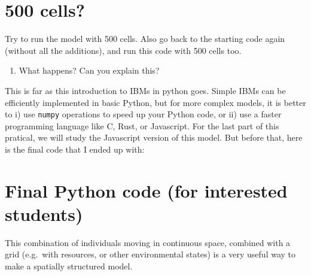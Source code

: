 \documentclass[
  letterpaper,
  DIV=11,
  numbers=noendperiod]{scrreprt}
\providecommand{\tightlist}{%
  \setlength{\itemsep}{0pt}\setlength{\parskip}{0pt}}\usepackage{longtable,booktabs,array}
\theoremstyle{definition}
\theoremstyle{remark}
\begin{document}
\section{500 cells?}\label{cells}

Try to run the model with 500 cells. Also go back to the starting code
again (without all the additions), and run this code with 500 cells too.

\begin{enumerate}
\def\labelenumi{\alph{enumi}.}
\tightlist
\item
  What happens? Can you explain this?
\end{enumerate}

This is far as this introduction to IBMs in python goes. Simple IBMs can
be efficiently implemented in basic Python, but for more complex models,
it is better to i) use \texttt{numpy} operations to speed up your Python
code, or ii) use a faster programming language like C, Rust, or
Javascript. For the last part of this pratical, we will study the
Javascript version of this model. But before that, here is the final
code that I ended up with:

\section{Final Python code (for interested
students)}\label{final-python-code-for-interested-students}

This combination of individuals moving in continuous space, combined
with a grid (e.g.~with resources, or other environmental states) is a
very useful way to make a spatially structured model.
\end{document}
